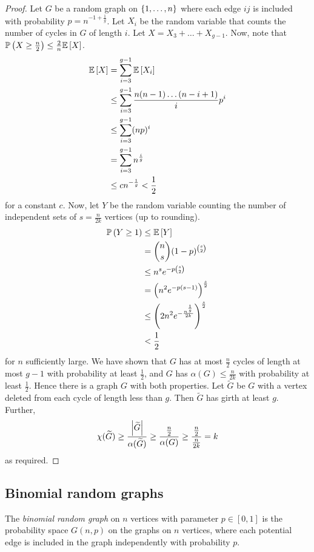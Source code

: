 \begin{proof}
	Let \( G \) be a random graph on \( \qty{1, \dots, n} \) where each edge \( ij \) is included with probability \( p = n^{-1 + \frac{1}{g}} \).
	Let \( X_i \) be the random variable that counts the number of cycles in \( G \) of length \( i \).
	Let \( X = X_3 + \dots + X_{g-1} \).
	Now, note that \( \mathbb{P}\left({X \geq \frac{n}{2}}\right) \leq \frac{2}{n} \mathbb{E}\left[{X}\right] \).
	\begin{align*}
		\mathbb{E}\left[{X}\right] &= \sum_{i=3}^{g-1} \mathbb{E}\left[{X_i}\right] \\
		&\leq \sum_{i=3}^{g-1} \frac{n(n-1) \dots (n-i+1)}{i} p^i \\
		&\leq \sum_{i=3}^{g-1} (np)^i \\
		&= \sum_{i=3}^{g-1} n^{\frac{i}{g}} \\
		&\leq c n^{-\frac{1}{g}} < \frac{1}{2}
	\end{align*}
	for a constant \( c \).
	Now, let \( Y \) be the random variable counting the number of independent sets of \( s = \frac{n}{2k} \) vertices (up to rounding).
	\begin{align*}
		\mathbb{P}\left({Y \geq 1}\right) &\leq \mathbb{E}\left[{Y}\right] \\
		&= \binom n s (1-p)^{\binom s 2} \\
		&\leq n^s e^{-p\binom s 2} \\
		&= \qty(n^2 e^{-p(s-1)})^{\frac{s}{2}} \\
		&\leq \qty(2n^2 e^{-\frac{n^{\frac 1 g}}{2k}})^{\frac{s}{2}} \\
		&< \frac{1}{2}
	\end{align*}
	for \( n \) sufficiently large.
	We have shown that \( G \) has at most \( \frac{n}{2} \) cycles of length at most \( g - 1 \) with probability at least \( \frac{1}{2} \), and \( G \) has \( \alpha(G) \leq \frac{n}{2k} \) with probability at least \( \frac{1}{2} \).
	Hence there is a graph \( G \) with both properties.
	Let \( \widetilde G \) be \( G \) with a vertex deleted from each cycle of length less than \( g \).
	Then \( \widetilde G \) has girth at least \( g \).
	Further,
	\[ \chi(\widetilde G) \geq \frac{\abs{\widetilde G}}{\alpha(\widetilde G)} \geq \frac{\frac{n}{2}}{\alpha(G)} \geq \frac{\frac{n}{2}}{\frac{n}{2k}} = k \]
	as required.
\end{proof}

\subsection{Binomial random graphs}
\begin{definition}
	The \emph{binomial random graph} on \( n \) vertices with parameter \( p \in [0,1] \) is the probability space \( G(n,p) \) on the graphs on \( n \) vertices, where each potential edge is included in the graph independently with probability \( p \).
\end{definition}
